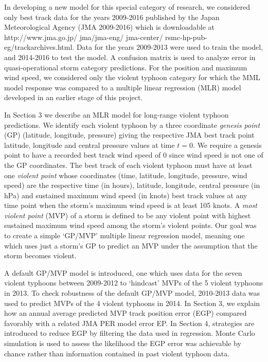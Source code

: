 \documentclass[a4paper, 12pt]{article}
\begin{document}
{  In developing a new model for this special category of research, we considered only  best track data for the years 2009-2016  published by the Japan Meteorological Agency (JMA 2009-2016) which is downloadable at  http://www.jma.go.jp/ jma/jma-eng/ jma-center/ rsmc-hp-pub-eg/trackarchives.html. Data for the years 2009-2013 were used to train the model, and 2014-2016 to test the model. A confusion matrix is used to analyze error in quasi-operational storm category predictions.  For the position and maximum wind speed, we considered only the violent typhoon category for which the MML model response was compared to a multiple linear regression (MLR) model developed in an earlier stage of this project.
  
  
  

   In Section 3 we describe an MLR model for long-range violent typhoon predictions. We identify each violent typhoon by a three coordinate \emph{genesis point} (GP) (latitude, longitude, pressure) giving the respective JMA best track point latitude, longitude and central pressure values at time $t=0$. We require a genesis point to have a recorded best track wind speed of 0 since wind speed is not one of the GP coordinates. The best track of each violent typhoon must have at least one \emph{violent point} whose coordinates (time, latitude, longitude, pressure, wind speed) are the respective time (in hours), latitude, longitude, central pressure (in hPa) and sustained maximum wind speed (in knots) best track values at any time point when the storm's maximum wind speed is at least 105 knots. A \emph{most violent point} (MVP) of a storm is defined to be any violent point with highest sustained maximum wind speed among the storm's violent points. Our goal was to create a simple `GP/MVP' multiple linear regression model, meaning one which uses just a storm's GP to predict an MVP under the assumption that the storm becomes violent.
   
   A default GP/MVP model is introduced, one which uses data for the seven violent typhoons between 2009-2012 to `hindcast'  MVPs of the 5 violent typhoons in 2013. To check robustness of the default GP/MVP model, 2010-2013 data was used to predict MVPs of the 4 violent typhoons in 2014.   In Section 3, we explain how an annual average predicted MVP track position error (EGP) compared favorably with a related JMA PER model error EP. In Section 4, strategies are introduced to reduce EGP by filtering the data used in regression. Monte Carlo simulation is used to assess the likelihood the EGP error was achievable by chance rather than information contained in past violent typhoon data.

}
\end{document}
